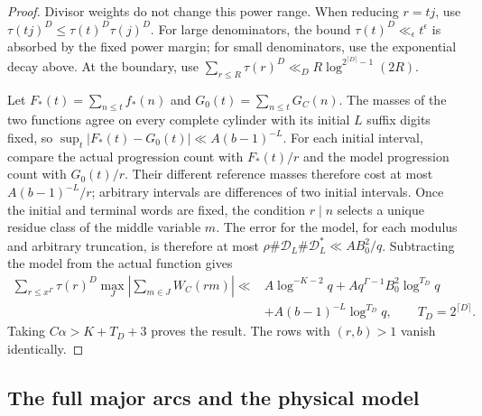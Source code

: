 \documentclass[11pt,a4paper]{article}
\theoremstyle{paperplain}
\numberwithin{equation}{section}
\begin{document}
\begin{proof}
Divisor weights do not change this power range.
When reducing $r=tj$, use
$\tau(tj)^D\le\tau(t)^D\tau(j)^D$.
For large denominators, the bound $\tau(t)^D\ll_\epsilon t^\epsilon$
is absorbed by the fixed power margin; for small denominators, use
the exponential decay above.
At the boundary, use
$\sum_{r\le R}\tau(r)^D\ll_DR\log^{2^{\lceil D\rceil}-1}(2R)$.

Let $F_*(t)=\sum_{n\le t}f_*(n)$ and
$G_0(t)=\sum_{n\le t}G_C(n)$.
The masses of the two functions agree on every complete cylinder with
its initial $L$ suffix digits fixed, so
$\sup_t|F_*(t)-G_0(t)|\ll A(b-1)^{-L}$.
For each initial interval, compare the actual progression count with
$F_*(t)/r$ and the model progression count with $G_0(t)/r$.
Their different reference masses therefore cost at most
$A(b-1)^{-L}/r$; arbitrary intervals are differences of two
initial intervals.
Once the initial and terminal words are fixed, the condition $r\mid n$
selects a unique residue class of the middle variable $m$.
The error for the model, for each modulus and arbitrary truncation,
is therefore at most
$\rho\#\mathcal D_L\#\mathcal D_L^*\ll AB_0^2/q$.
Subtracting the model from the actual function gives
\begin{align*}
 \sum_{r\le x^\Gamma}\tau(r)^D\max_J
 \left|\sum_{m\in J}W_C(rm)\right|
 \ll{}&A\log^{-K-2}q
   +Aq^{\Gamma-1}B_0^2\log^{T_D}q\\
 &+A(b-1)^{-L}\log^{T_D}q,\qquad T_D=2^{\lceil D\rceil}.
\end{align*}
Taking $C\alpha>K+T_D+3$ proves the result.
The rows with $(r,b)>1$ vanish identically.
\end{proof}

\subsection{The full major arcs and the physical model}
\end{document}
